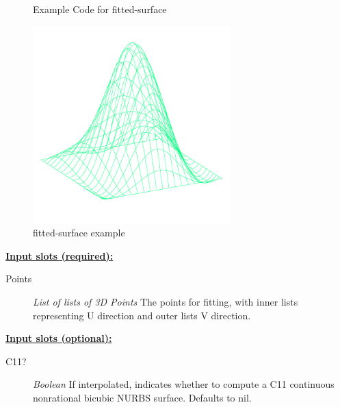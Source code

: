 \documentclass [11pt]{book}
\begin{document}
\begin{itemize}
\begin{figure}
\caption{Example Code for fitted-surface}

\label{fig:example-code-fitted-surface}

\end{figure}

\begin{figure}
\begin{center}
\includegraphics[width=3in,height=3in]{../images/example-fitted-surface.pdf}
\end{center}

\caption{fitted-surface example}

\label{fig:fitted-surface}

\end{figure}





\textbf{
\underline{Input slots (required):}}

\begin{description}

\item [Points]
\emph{List of lists of 3D Points} The points for fitting, with inner lists representing U direction and outer lists V direction.


\end{description}






\textbf{
\underline{Input slots (optional):}}

\begin{description}

\item [C11?]
\emph{Boolean} If interpolated, indicates whether to compute a C11 continuous nonrational bicubic NURBS surface. Defaults to nil.



\end{description}
\end{itemize}
\end{document}
